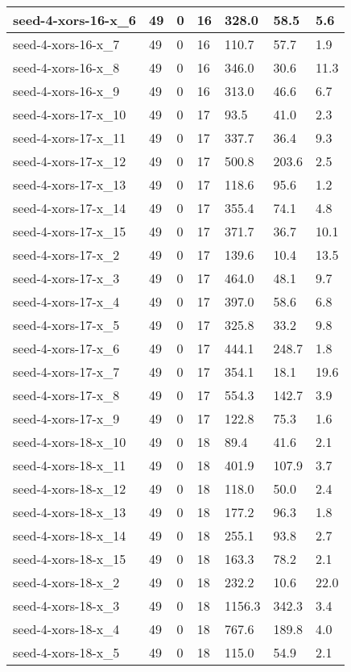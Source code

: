 \begin{scriptsize}
\begin{longtable}{|p{5cm}|l|l|l|l|l|l|}
seed-4-xors-16-x\_6&49&0&16&328.0&58.5&5.6 \\ \hline 
seed-4-xors-16-x\_7&49&0&16&110.7&57.7&1.9 \\ \hline 
seed-4-xors-16-x\_8&49&0&16&346.0&30.6&11.3 \\ \hline 
seed-4-xors-16-x\_9&49&0&16&313.0&46.6&6.7 \\ \hline 
seed-4-xors-17-x\_10&49&0&17&93.5&41.0&2.3 \\ \hline 
seed-4-xors-17-x\_11&49&0&17&337.7&36.4&9.3 \\ \hline 
seed-4-xors-17-x\_12&49&0&17&500.8&203.6&2.5 \\ \hline 
seed-4-xors-17-x\_13&49&0&17&118.6&95.6&1.2 \\ \hline 
seed-4-xors-17-x\_14&49&0&17&355.4&74.1&4.8 \\ \hline 
seed-4-xors-17-x\_15&49&0&17&371.7&36.7&10.1 \\ \hline 
seed-4-xors-17-x\_2&49&0&17&139.6&10.4&13.5 \\ \hline 
seed-4-xors-17-x\_3&49&0&17&464.0&48.1&9.7 \\ \hline 
seed-4-xors-17-x\_4&49&0&17&397.0&58.6&6.8 \\ \hline 
seed-4-xors-17-x\_5&49&0&17&325.8&33.2&9.8 \\ \hline 
seed-4-xors-17-x\_6&49&0&17&444.1&248.7&1.8 \\ \hline 
seed-4-xors-17-x\_7&49&0&17&354.1&18.1&19.6 \\ \hline 
seed-4-xors-17-x\_8&49&0&17&554.3&142.7&3.9 \\ \hline 
seed-4-xors-17-x\_9&49&0&17&122.8&75.3&1.6 \\ \hline 
seed-4-xors-18-x\_10&49&0&18&89.4&41.6&2.1 \\ \hline 
seed-4-xors-18-x\_11&49&0&18&401.9&107.9&3.7 \\ \hline 
seed-4-xors-18-x\_12&49&0&18&118.0&50.0&2.4 \\ \hline 
seed-4-xors-18-x\_13&49&0&18&177.2&96.3&1.8 \\ \hline 
seed-4-xors-18-x\_14&49&0&18&255.1&93.8&2.7 \\ \hline 
seed-4-xors-18-x\_15&49&0&18&163.3&78.2&2.1 \\ \hline 
seed-4-xors-18-x\_2&49&0&18&232.2&10.6&22.0 \\ \hline 
seed-4-xors-18-x\_3&49&0&18&1156.3&342.3&3.4 \\ \hline 
seed-4-xors-18-x\_4&49&0&18&767.6&189.8&4.0 \\ \hline 
seed-4-xors-18-x\_5&49&0&18&115.0&54.9&2.1 \\ \hline 

\end{longtable}
\end{scriptsize}
